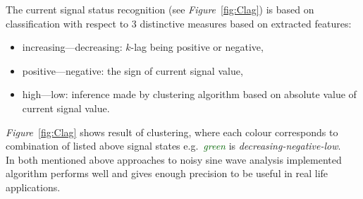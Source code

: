\documentclass[11pt, letterpaper]{article}            %
\begin{document}
The current signal status recognition (see \emph{Figure}~\ref{fig:Clag}) is based on classification with respect to 3 distinctive measures based on extracted features:
\begin{itemize}
  \item increasing---decreasing: $k$-lag being positive or negative,
  \item positive---negative: the sign of current signal value,
  \item high---low: inference made by clustering algorithm based on absolute value of current signal value.
\end{itemize}
\emph{Figure}~\ref{fig:Clag} shows result of clustering, where each colour corresponds to combination of listed above signal states e.g.\ \emph{\textcolor{darkgreen}{green}} is \emph{decreasing-negative-low}.\\

In both mentioned above approaches to noisy sine wave analysis implemented algorithm performs well and gives enough precision to be useful in real life applications.
\end{document}
